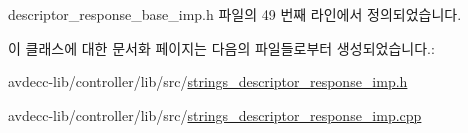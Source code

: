 descriptor\+\_\+response\+\_\+base\+\_\+imp.\+h 파일의 49 번째 라인에서 정의되었습니다.



이 클래스에 대한 문서화 페이지는 다음의 파일들로부터 생성되었습니다.\+:\begin{DoxyCompactItemize}
\item 
avdecc-\/lib/controller/lib/src/\hyperlink{strings__descriptor__response__imp_8h}{strings\+\_\+descriptor\+\_\+response\+\_\+imp.\+h}\item 
avdecc-\/lib/controller/lib/src/\hyperlink{strings__descriptor__response__imp_8cpp}{strings\+\_\+descriptor\+\_\+response\+\_\+imp.\+cpp}\end{DoxyCompactItemize}
